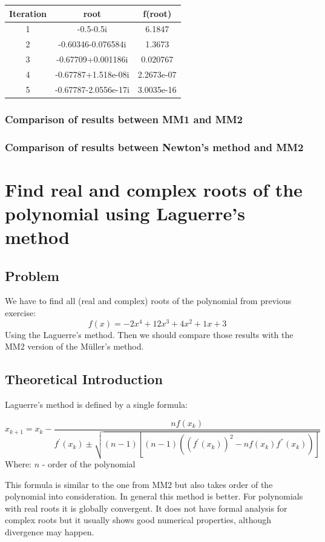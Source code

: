 \documentclass[12pt]{report}
\begin{document}
\begin{center}
  \begin{tabular}{| c  c c |}
\hline
Iteration & root         & f(root) \\
\hline
1    &      -0.5-0.5i           &       6.1847 \\
\hline
2    &  -0.60346-0.076584i      &       1.3673  \\
\hline
3    &  -0.67709+0.001186i      &     0.020767 \\
\hline
4    &  -0.67787+1.518e-08i     &   2.2673e-07  \\
\hline
5    &  -0.67787-2.0556e-17i    &  3.0035e-16   \\
\hline

\end{tabular}
\end{center}

\subsection{Comparison of results between MM1 and MM2}
\subsection{Comparison of results between Newton's method and MM2}

\chapter{Find real and complex roots of the polynomial using Laguerre's method}

\section{Problem}
We have to find all (real and complex) roots of the polynomial from previous exercise:
\[ f(x) = -2x^4+12x^3+4x^2+1x+3 \]
Using the Laguerre's method. Then we should compare those results with the MM2 version of the  M{\"u}ller's method.


\section{Theoretical Introduction}
Laguerre's method is defined by a single formula:

\[ x_{k+1} = x_k - \frac{nf(x_k)}{f^{'}(x_k) \pm \sqrt{(n-1)[(n-1)( (f^{'}(x_k))^2 - nf(x_k)f^{''}(x_k) )]}} \]
Where:
$n$ - order of the polynomial

This formula is similar to the one from MM2 but also takes order of the polynomial into consideration. In general this method is better. For polynomials with real roots it is globally convergent. It does not have formal analysis for complex roots but it usually shows good numerical properties, although divergence may happen.
\end{document}
